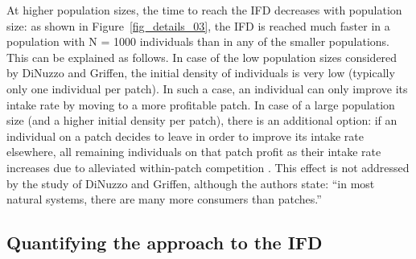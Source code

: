 \begin{interludeenv}
	At higher population sizes, the time to reach the IFD decreases with population size: as shown in Figure~\ref{fig_details_03}, the IFD is reached much faster in a population with N = 1000 individuals than in any of the smaller populations.
	This can be explained as follows.
	In case of the low population sizes considered by DiNuzzo and Griffen, the initial density of individuals is very low (typically only one individual per patch).
	In such a case, an individual can only improve its intake rate by moving to a more profitable patch.
	In case of a large population size (and a higher initial density per patch), there is an additional option: if an individual on a patch decides to leave in order to improve its intake rate elsewhere, all remaining individuals on that patch profit as their intake rate increases due to alleviated within-patch competition .
	This effect is not addressed by the study of DiNuzzo and Griffen, although the authors state: ``in most natural systems, there are many more consumers than patches.'' 

	\subsection*{Quantifying the approach to the IFD}
	

\end{interludeenv}
